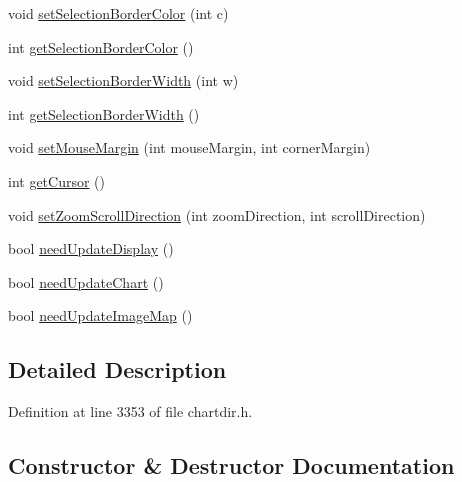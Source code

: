 \begin{DoxyCompactItemize}
\item 
void \hyperlink{class_view_port_control_base_a159e58f8274c0b2551819e3815f0f449}{set\+Selection\+Border\+Color} (int c)
\item 
int \hyperlink{class_view_port_control_base_a860df7a275bd13df2c16938705b13a8b}{get\+Selection\+Border\+Color} ()
\item 
void \hyperlink{class_view_port_control_base_a9ec03a5df85ac3ba8f035453e913781f}{set\+Selection\+Border\+Width} (int w)
\item 
int \hyperlink{class_view_port_control_base_a2322d5ea78c42aeec9fbf54bbb2c2377}{get\+Selection\+Border\+Width} ()
\item 
void \hyperlink{class_view_port_control_base_a1327e8db8c2cc99e26826caebf4116f3}{set\+Mouse\+Margin} (int mouse\+Margin, int corner\+Margin)
\item 
int \hyperlink{class_view_port_control_base_ad0b5e626bc296d047dec3498441f8ef9}{get\+Cursor} ()
\item 
void \hyperlink{class_view_port_control_base_a8c47c8c403ff206cc622de6585ecc853}{set\+Zoom\+Scroll\+Direction} (int zoom\+Direction, int scroll\+Direction)
\item 
bool \hyperlink{class_view_port_control_base_ac88b94bceba50048286852267537106a}{need\+Update\+Display} ()
\item 
bool \hyperlink{class_view_port_control_base_a7d15bce14cf6b575b446df8ca7d8e24c}{need\+Update\+Chart} ()
\item 
bool \hyperlink{class_view_port_control_base_a7df219989bfe6feec0a34baab795b980}{need\+Update\+Image\+Map} ()
\end{DoxyCompactItemize}


\subsection{Detailed Description}


Definition at line 3353 of file chartdir.\+h.



\subsection{Constructor \& Destructor Documentation}
\mbox{\label{class_view_port_control_base_a2fed0f0fe399b69400bf1b6f90aa62e4}} 

